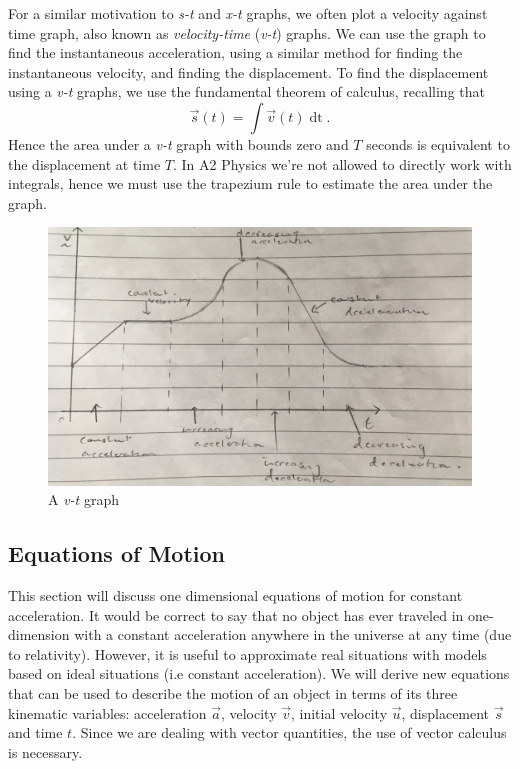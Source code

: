 For a similar motivation to \textit{s-t} and \textit{x-t} graphs, we often plot a velocity against time graph, also known as \textit{velocity-time} (\textit{v-t}) graphs. We can use the graph to find the instantaneous acceleration, using a similar method for finding the instantaneous velocity, and finding the displacement. To find the displacement using a \textit{v-t} graphs, we use the fundamental theorem of calculus, recalling that
\begin{equation*}
    \vec{s}(t) = \int \vec{v}(t) \mathop{\mathrm{d}t}.
\end{equation*}
Hence the area under a \textit{v-t} graph with bounds zero and $T$ seconds is equivalent to the displacement at time $T$. In A2 Physics we're not allowed to directly work with integrals, hence we must use the trapezium rule to estimate the area under the graph.  

\begin{figure}[h!]
    \centering
    \includegraphics[scale=0.1]{notes/images/Velocity-Time-Graph.jpg}
    \caption{A \textit{v-t} graph}
\end{figure}
\FloatBarrier

\subsection{Equations of Motion}
\label{subsection:equations-of-motion}

This section will discuss one dimensional equations of motion for constant acceleration. It would be correct to say that no object has ever traveled in one-dimension with a constant acceleration anywhere in the universe at any time (due to relativity). However, it is useful to approximate real situations with models based on ideal situations (i.e constant acceleration). We will derive new equations that can be used to describe the motion of an object in terms of its three kinematic variables: acceleration $\vec{a}$, velocity $\vec{v}$, initial velocity $\vec{u}$, displacement $\vec{s}$ and time $t$. Since we are dealing with vector quantities, the use of vector calculus is necessary. 

